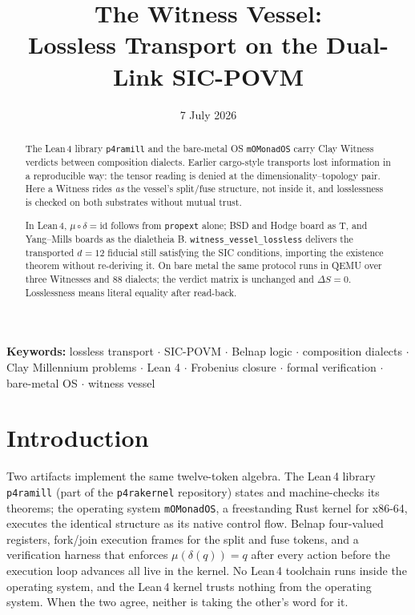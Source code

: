 \documentclass[12pt,a4paper]{article}
\newcommand{\Lean}{\textsf{Lean}\,4}
\newcommand{\bT}{\textsf{T}}
\newcommand{\bB}{\textsf{B}}
\begin{document}
\title{\textbf{The Witness Vessel:\\
Lossless Transport on the Dual-Link SIC-POVM}}


\date{7 July 2026}

\maketitle

\begin{abstract}
The \Lean{} library \texttt{p4ramill} and the bare-metal OS \texttt{mOMonadOS}
carry Clay Witness verdicts between composition dialects.  Earlier cargo-style
transports lost information in a reproducible way: the tensor reading is denied
at the dimensionality--topology pair.  Here a Witness rides \emph{as} the vessel's
split/fuse structure, not inside it, and losslessness is checked on both
substrates without mutual trust.

In \Lean{}, $\mu\circ\delta=\mathrm{id}$ follows from \texttt{propext} alone;
BSD and Hodge board as \bT{}, and Yang--Mills boards as the dialetheia \bB{}.
\texttt{witness\_vessel\_lossless} delivers the transported $d=12$ fiducial
still satisfying the SIC conditions, importing the existence theorem without
re-deriving it.  On bare metal the same protocol runs in QEMU over three
Witnesses and $88$ dialects; the verdict matrix is unchanged and $\Delta S=0$.
Losslessness means literal equality after read-back.
\end{abstract}

\noindent\textbf{Keywords:} lossless transport \(\cdot\) SIC-POVM \(\cdot\)
Belnap logic \(\cdot\) composition dialects \(\cdot\) Clay Millennium problems
\(\cdot\) Lean 4 \(\cdot\) Frobenius closure \(\cdot\) formal verification
\(\cdot\) bare-metal OS \(\cdot\) witness vessel

\newpage
\tableofcontents
\newpage

\section{Introduction}

Two artifacts implement the same twelve-token algebra.  The \Lean{} library
\texttt{p4ramill} (part of the \texttt{p4rakernel} repository) states and
machine-checks its theorems; the operating system \texttt{mOMonadOS}, a
freestanding Rust kernel for x86-64, executes the identical structure as its
native control flow.  Belnap four-valued registers, fork/join execution frames
for the split and fuse tokens, and a verification harness that enforces
$\mu(\delta(q)) = q$ after every action before the execution loop advances all
live in the kernel.  No \Lean{} toolchain runs inside the operating system, and
the \Lean{} kernel trusts nothing from the operating system.  When the two
agree, neither is taking the other's word for it.
\end{document}
